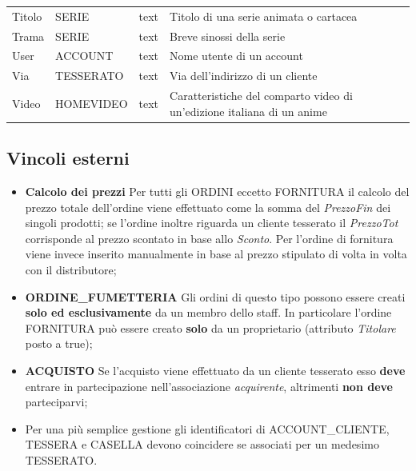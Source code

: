 \documentclass[a4paper]{scrartcl}
\begin{document}
\begin{footnotesize}
\begin{longtable}{p{} p{} p{} p{}}
	Titolo & 
	SERIE &
	text &
	Titolo di una serie animata o cartacea \\
	
	Trama &
	SERIE &
	text &
	Breve sinossi della serie \\
	
	User &
	ACCOUNT &
	text &
	Nome utente di un account \\
	
	Via &
	TESSERATO &
	text &
	Via dell'indirizzo di un cliente \\
	
	Video &
	HOMEVIDEO &
	text &
	Caratteristiche del comparto video di un'edizione italiana di un anime \\
	
\end{longtable}

\subsection*{\color[RGB]{155,0,20}Vincoli esterni}
\begin{itemize}
\item \textbf{Calcolo dei prezzi} Per tutti gli ORDINI eccetto FORNITURA il calcolo del prezzo totale dell'ordine viene effettuato come la somma del \textit{PrezzoFin} dei singoli prodotti; se l'ordine inoltre riguarda un cliente tesserato il \textit{PrezzoTot} corrisponde al prezzo scontato in base allo \textit{Sconto}. Per l'ordine di fornitura viene invece inserito manualmente in base al prezzo stipulato di volta in volta con il distributore;

\item \textbf{ORDINE\_{FUMETTERIA}} Gli ordini di questo tipo possono essere creati \textbf{solo ed esclusivamente} da un membro dello staff. In particolare l'ordine FORNITURA può essere creato \textbf{solo} da un proprietario (attributo \textit{Titolare} posto a true);

\item \textbf{ACQUISTO} Se l'acquisto viene effettuato da un cliente tesserato esso \textbf{deve} entrare in partecipazione nell'associazione \textit{acquirente}, altrimenti \textbf{non deve} parteciparvi;

\item Per una più semplice gestione gli identificatori di ACCOUNT\_{CLIENTE}, TESSERA e CASELLA devono coincidere se associati per un medesimo TESSERATO.
\end{itemize}



\end{footnotesize}
\end{document}
